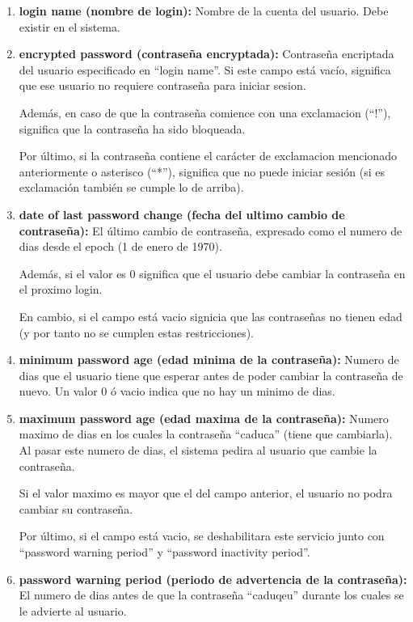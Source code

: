 \documentclass{article}
\begin{document}
\begin{enumerate}
    \item \textbf{login name (nombre de login): }Nombre de la cuenta del usuario. Debe existir en el sistema.
    
    \item \textbf{encrypted password (contraseña encryptada): }Contraseña encriptada del usuario especificado en ``login name''. Si este campo está vacío, significa que ese usuario no requiere contraseña para iniciar sesion. 
    
    Además, en caso de que la contraseña comience con una exclamacion (``!''), significa que la contraseña ha sido bloqueada.

    Por último, si la contraseña contiene el carácter de exclamacion mencionado anteriormente o asterisco (``*''), significa que no puede iniciar sesión (si es exclamación también se cumple lo de arriba).

    \item \textbf{date of last password change (fecha del ultimo cambio de contraseña): }El último cambio de contraseña, expresado como el numero de dias desde el epoch (1 de enero de 1970).
    
    Además, si el valor es 0 significa que el usuario debe cambiar la contraseña en el proximo login.

    En cambio, si el campo está vacio signicia que las contraseñas no tienen edad (y por tanto no se cumplen estas restricciones).

    \item \textbf{minimum password age (edad minima de la contraseña): }Numero de dias que el usuario tiene que esperar antes de poder cambiar la contraseña de nuevo. Un valor 0 ó vacio indica que no hay un minimo de dias.
    \item \textbf{maximum password age (edad maxima de la contraseña): }Numero maximo de dias en los cuales la contraseña ``caduca'' (tiene que cambiarla). Al pasar este numero de dias, el sistema pedira al usuario que cambie la contraseña.
    
    Si el valor maximo es mayor que el del campo anterior, el usuario no podra cambiar su contraseña.

    Por último, si el campo está vacio, se deshabilitara este servicio junto con ``password warning period'' y ``password inactivity period''.

    \item \textbf{password warning period (periodo de advertencia de la contraseña): }El numero de dias antes de que la contraseña ``caduqeu'' durante los cuales se le  advierte al usuario.
    

\end{enumerate}
\end{document}
